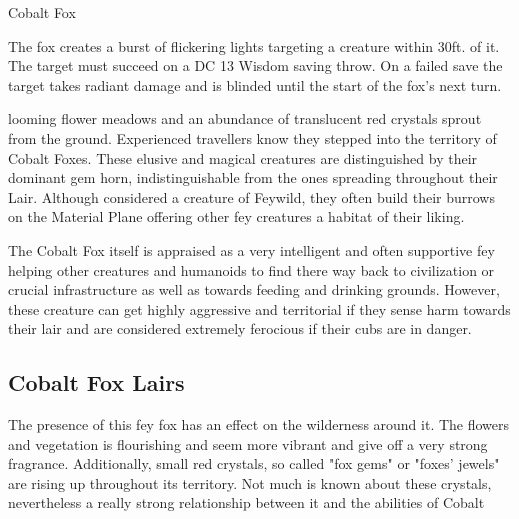 \begin{DndMonster}[width=0.5\textwidth]{Cobalt Fox}
    \DndMonsterAttack[
      name=Gore,
      distance=melee, %
      mod=+4,
      reach=5,
      targets=one target,
      dmg=\DndDice{2d6 + 2},
      dmg-type=piercing,
    ]
    
    The fox creates a burst of flickering lights targeting a creature within 30ft. of it. The target must succeed on a DC 13 Wisdom saving throw. On a failed save the target takes  radiant damage and is blinded until the start of the fox's next turn.
      
\end{DndMonster}

\vfill\eject

\vspace*{-6\fontdimen6\font}

\entryfont \noindent {}looming flower meadows and an abundance of translucent red crystals sprout from the ground. Experienced travellers know they stepped into the territory of Cobalt Foxes. These elusive and magical creatures are distinguished by their dominant gem horn, indistinguishable from the ones spreading throughout their Lair. Although considered a creature of Feywild, they often build their burrows on the Material Plane offering other fey creatures a habitat of their liking.

 The Cobalt Fox itself is appraised as a very intelligent and often supportive fey helping other creatures and humanoids to find there way back to civilization or crucial infrastructure as well as towards feeding and drinking grounds. However, these creature can get highly aggressive and territorial if they sense harm towards their lair and are considered extremely ferocious if their cubs are in danger.\\

\subsection*{Cobalt Fox Lairs}
The presence of this fey fox has an effect on the wilderness around it. The flowers and vegetation is flourishing and seem more vibrant and give off a very strong fragrance. Additionally, small red crystals, so called "fox gems" or "foxes' jewels" are rising up throughout its territory. Not much is known about these crystals, nevertheless a really strong relationship between it and the abilities of Cobalt \linebreak

